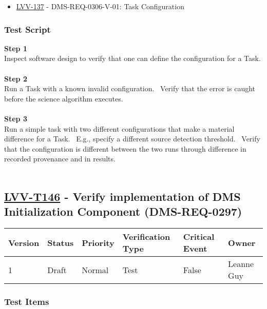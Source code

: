 \begin{itemize}
\tightlist
\item
  \href{https://jira.lsstcorp.org/browse/LVV-137}{LVV-137} -
  DMS-REQ-0306-V-01: Task Configuration
\end{itemize}

\hypertarget{test-script-122}{%
\subsubsection{Test Script}\label{test-script-122}}

\textbf{Step 1}\\
Inspect software design to verify that one can define the configuration
for a Task.\\
~\\
\textbf{Step 2}\\
Run a Task with a known invalid configuration. ~Verify that the error is
caught before the science algorithm executes.\\
~\\
\textbf{Step 3}\\
Run a simple task with two different configurations that make a material
difference for a Task. ~E.g., specify a different source detection
threshold. ~Verify that the configuration is different between the two
runs through difference in recorded provenance and in results.\\
~\\

\hypertarget{lvv-t146---verify-implementation-of-dms-initialization-component-dms-req-0297}{%
\subsection{\texorpdfstring{\href{https://jira.lsstcorp.org/secure/Tests.jspa\#/testCase/LVV-T146}{LVV-T146}
- Verify implementation of DMS Initialization Component
(DMS-REQ-0297)}{LVV-T146 - Verify implementation of DMS Initialization Component (DMS-REQ-0297)}}\label{lvv-t146---verify-implementation-of-dms-initialization-component-dms-req-0297}}

\begin{longtable}[]{@{}llllll@{}}
\toprule
Version & Status & Priority & Verification Type & Critical Event &
Owner\tabularnewline
\midrule
\endhead
1 & Draft & Normal & Test & False & Leanne Guy\tabularnewline
\bottomrule
\end{longtable}

\hypertarget{test-items-122}{%
\subsubsection{Test Items}\label{test-items-122}}

